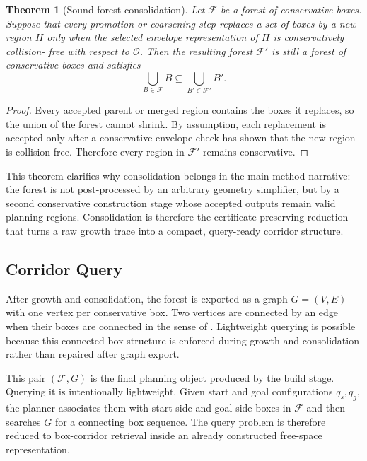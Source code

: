 \documentclass[journal]{IEEEtran}
\newtheorem{theorem}{Theorem}
\newcommand{\calO}{\ensuremath{\mathcal{O}}}
\begin{document}
\begin{theorem}[Sound forest consolidation]
\label{thm:forest_consolidation}
Let $\mathcal{F}$ be a forest of conservative boxes. Suppose that every promotion
or coarsening step replaces a set of boxes by a new region $H$ only when the
selected envelope representation of $H$ is conservatively collision-
free with respect to $\calO$. Then the resulting forest
$\mathcal{F}'$ is still a forest of conservative boxes and satisfies
\[
\bigcup_{B\in\mathcal{F}} B \subseteq \bigcup_{B'\in\mathcal{F}'} B'.
\]
\end{theorem}

\begin{proof}
Every accepted parent or merged region contains the boxes it replaces, so the
union of the forest cannot shrink. By assumption, each replacement is accepted
only after a conservative envelope check has shown that the new region is
collision-free. Therefore every region in $\mathcal{F}'$ remains conservative.
\end{proof}

This theorem clarifies why consolidation belongs in the main method narrative:
the forest is not post-processed by an arbitrary geometry simplifier, but by a
second conservative construction stage whose accepted outputs remain valid
planning regions. Consolidation is therefore the certificate-preserving
reduction that turns a raw growth trace into a compact, query-ready corridor
structure.

\subsection{Corridor Query}
\label{sec:forest_graph}

After growth and consolidation, the forest is exported as a graph
$G=(V,E)$ with one vertex per conservative box. Two vertices are connected by an
edge when their boxes are connected in the sense of
. Lightweight querying is possible because this
connected-box structure is enforced during growth and consolidation rather
than repaired after graph export.

This pair $(\mathcal{F},G)$ is the final planning object produced by the build
stage. Querying it is intentionally lightweight. Given start and goal
configurations $q_s,q_g$, the planner associates them with start-side and
goal-side boxes in $\mathcal{F}$ and then searches $G$ for a connecting box
sequence. The query problem is therefore reduced to box-corridor
retrieval inside an already constructed free-space representation.
\end{document}
